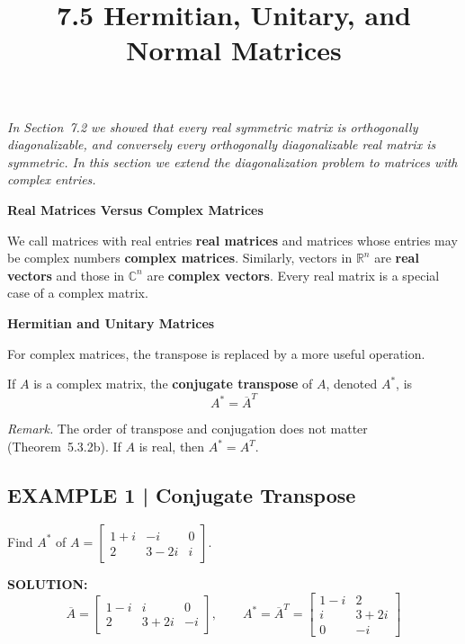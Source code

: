 \documentclass{article}
\title{7.5 Hermitian, Unitary, and Normal Matrices}
\date{}
\author{}
\newcommand{\redheading}[1]{{\vspace{2mm}\noindent\Large\bfseries\color{red!55!black} #1\par}\vspace{2mm}}
\begin{document}
\maketitle

{\itshape\color{blue!45!black}
In Section~7.2 we showed that every real symmetric matrix is orthogonally diagonalizable,
and conversely every orthogonally diagonalizable real matrix is symmetric.
In this section we extend the diagonalization problem to matrices with complex entries.\par}

\vspace{2mm}

\redheading{Real Matrices Versus Complex Matrices}

We call matrices with real entries \textbf{real matrices} and matrices whose entries may be complex numbers \textbf{complex matrices}. Similarly, vectors in $\mathbb{R}^n$ are \textbf{real vectors} and those in $\mathbb{C}^n$ are \textbf{complex vectors}. Every real matrix is a special case of a complex matrix.

\redheading{Hermitian and Unitary Matrices}

For complex matrices, the transpose is replaced by a more useful operation.

\begin{tcolorbox}[colback=teal!4, colframe=teal!65!black,
  title={\textbf{Definition 1}}, boxrule=0.5mm, arc=3mm]
If $A$ is a complex matrix, the \textbf{conjugate transpose} of $A$, denoted $A^*$, is
\begin{equation}
  A^* = \overline{A}^T
\end{equation}
\end{tcolorbox}

\textit{Remark.} The order of transpose and conjugation does not matter (Theorem~5.3.2b).
If $A$ is real, then $A^* = A^T$.

\subsection*{EXAMPLE 1 | Conjugate Transpose}

Find $A^*$ of
$A = \begin{bmatrix} 1+i & -i & 0 \\ 2 & 3-2i & i \end{bmatrix}$.

\textbf{SOLUTION:}
\[
  \overline{A} = \begin{bmatrix} 1-i & i & 0 \\ 2 & 3+2i & -i \end{bmatrix},
  \qquad
  A^* = \overline{A}^T = \begin{bmatrix} 1-i & 2 \\ i & 3+2i \\ 0 & -i \end{bmatrix}
\]
\end{document}
